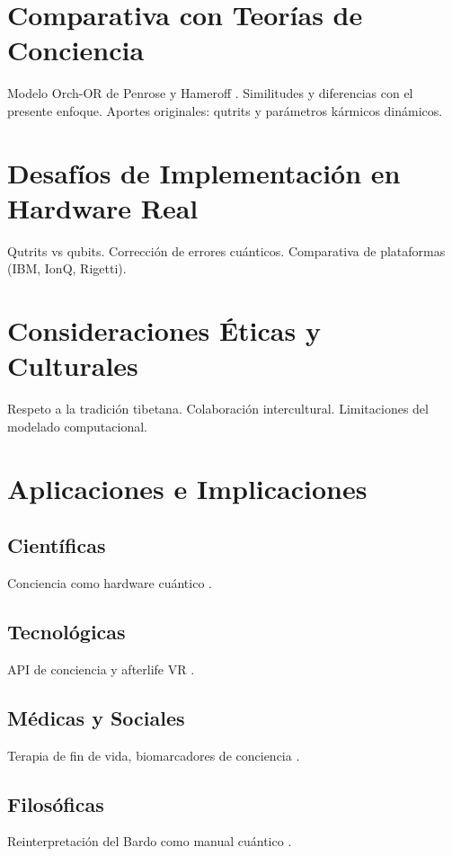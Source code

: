 \documentclass[12pt,a4paper]{article}
\begin{document}
\section{Comparativa con Teorías de Conciencia}
Modelo Orch-OR de Penrose y Hameroff \cite{hameroff2014consciousness}.  
Similitudes y diferencias con el presente enfoque.  
Aportes originales: qutrits y parámetros kármicos dinámicos.

\section{Desafíos de Implementación en Hardware Real}
Qutrits vs qubits. Corrección de errores cuánticos.  
Comparativa de plataformas (IBM, IonQ, Rigetti).  

\section{Consideraciones Éticas y Culturales}
Respeto a la tradición tibetana. Colaboración intercultural.  
Limitaciones del modelado computacional.  

\section{Aplicaciones e Implicaciones}

\subsection{Científicas}
Conciencia como hardware cuántico \cite{hameroff2014consciousness}.

\subsection{Tecnológicas}
API de conciencia y afterlife VR \cite{mit2024symmetry}.

\subsection{Médicas y Sociales}
Terapia de fin de vida, biomarcadores de conciencia \cite{stanford2023clearlight}.

\subsection{Filosóficas}
Reinterpretación del Bardo como manual cuántico \cite{penrose1994shadows}.
\end{document}
